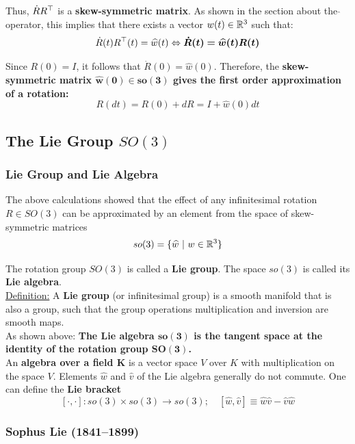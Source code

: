 Thus, $\dot{R}R^{\top}$ is a \textbf{skew-symmetric matrix}.
As shown in the section about the $\widehat{}$ operator, this implies that
there exists a vector $w(t) \in \mathbb{R}^3$ such that:
	\[\dot{R}(t)R^{\top}(t) = \widehat{w}(t)
	\Leftrightarrow \bm{ \dot{R}(t) = \widehat{w}(t)R(t)}\]

Since $R(0) = I$, it follows that $\dot{R}(0) = \widehat{w}(0)$.
Therefore, the \textbf{skew-symmetric matrix $\bm{\widehat{w}(0) \in so(3)}$
gives the first order approximation of a rotation:}
	\[R(dt) = R(0) + dR = I + \widehat{w}(0) dt\]


\subsection{The Lie Group $SO(3)$}%
\label{sub:the_lie_group_so_3_}


\subsubsection{Lie Group and Lie Algebra}%
\label{ssub:lie_group_and_lie_algebra}

The above calculations showed that the effect of any infinitesimal
rotation $R \in SO(3)$ can be approximated by an element from
the space of skew-symmetric matrices
	\[so(3) = \{ \widehat{w}\ |\ w \in \mathbb{R}^3\}\]

The rotation group $SO(3)$ is called a \textbf{Lie group}.
The space $so(3)$ is called its \textbf{Lie algebra}.\\

\underline{Definition:}
A \textbf{Lie group} (or infinitesimal group) is a smooth manifold that
is also a group, such that the group operations multiplication
and inversion are smooth maps.\\

As shown above: \textbf{The Lie algebra $\bm{so(3)}$ is the tangent space
at the identity of the rotation group $\bm{SO(3)}$.}\\

An \textbf{algebra over a field $\bm{K}$} is a vector space $V$ over $K$
with multiplication on the space $V$.
Elements $\widehat{w}$ and $\widehat{v}$ of the Lie algebra
generally do not commute.
One can define the \textbf{Lie bracket}
\[[\cdot,\cdot]: so(3) \times so(3) \rightarrow so(3);\quad
[\widehat{w},\widehat{v}] \equiv \widehat{w}\widehat{v} - \widehat{v}\widehat{w}\]


\subsubsection{Sophus Lie (1841--1899)}%
\label{ssub:sophus_lie_1841_1899_}


